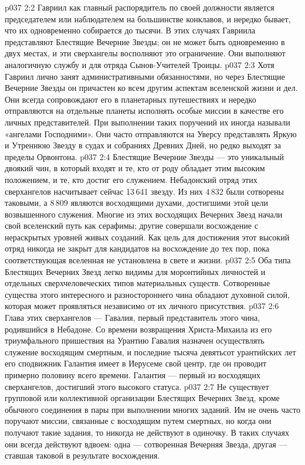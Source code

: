 \vs p037 2:2 Гавриил как главный распорядитель по своей должности является председателем или наблюдателем на большинстве конклавов, и нередко бывает, что их одновременно собирается до тысячи. В этих случаях Гавриила представляют Блестящие Вечерние Звезды; он не может быть одновременно в двух местах, и эти сверхангелы восполняют это ограничение. Они выполняют аналогичную службу и для отряда Сынов\hyp{}Учителей Троицы.
\vs p037 2:3 Хотя Гавриил лично занят административными обязанностями, но через Блестящие Вечерние Звезды он причастен ко всем другим аспектам вселенской жизни и дел. Они всегда сопровождают его в планетарных путешествиях и нередко отправляются на отдельные планеты исполнять особые миссии в качестве его личных представителей. При выполнении таких поручений их иногда называли «ангелами Господними». Они часто отправляются на Уверсу представлять Яркую и Утреннюю Звезду в судах и собраниях Древних Дней, но редко выходят за пределы Орвонтона.
\vs p037 2:4 \pc Блестящие Вечерние Звезды --- это уникальный двоякий чин, в который входят и те, кто от роду обладает этим высоким положением, и те, кто достиг его служением. Небадонский отряд этих сверхангелов насчитывает сейчас 13\,641 звезду. Из них 4\,832 были сотворены таковыми, а 8\,809 являются восходящими духами, достигшими этой цели возвышенного служения. Многие из этих восходящих Вечерних Звезд начали свой вселенский путь как серафимы; другие совершали восхождение с нераскрытых уровней живых созданий. Как цель для достижения этот высокий отряд никогда не закрыт для кандидатов на восхождение до тех пор, пока соответствующая вселенная не установлена в свете и жизни.
\vs p037 2:5 Оба типа Блестящих Вечерних Звезд легко видимы для моронтийных личностей и отдельных сверхчеловеческих типов материальных существ. Сотворенные существа этого интересного и разностороннего чина обладают духовной силой, которая может проявляться независимо от их личного присутствия.
\vs p037 2:6 \pc Глава этих сверхангелов --- Гавалия, первый представитель этого чина, родившийся в Небадоне. Со времени возвращения Христа\hyp{}Михаила из его триумфального пришествия на Урантию Гавалия назначен осуществлять служение восходящим смертным, и последние тысяча девятьсот урантийских лет его сподвижник Галантия имеет в Иерусеме свой центр, где он проводит примерно половину всего времени. Галантия --- первый из восходящих сверхангелов, достигший этого высокого статуса.
\vs p037 2:7 Не существует групповой или коллективной организации Блестящих Вечерних Звезд, кроме обычного соединения в пары при выполнении многих заданий. Им не очень часто поручают миссии, связанные с восходящим путем смертных, но когда они получают такие задания, то никогда не действуют в одиночку. В таких случаях они всегда действуют вдвоем: одна --- сотворенная Вечерняя Звезда, другая --- ставшая таковой в результате восхождения.
